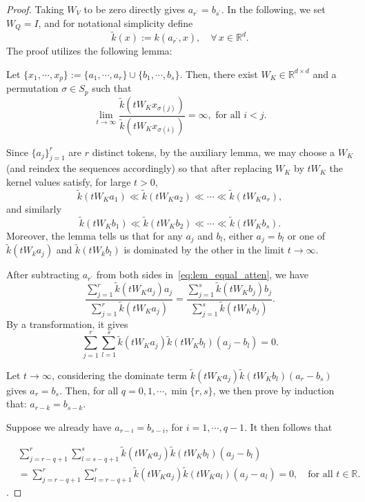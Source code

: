 \documentclass[10pt,a4paper]{amsart}
\begin{document}
\begin{proof}
    Taking $W_V$ to be zero directly gives $a_{r^\prime}=b_{s^\prime}$. In the following, we set $W_Q=I$, and for notational simplicity define
    \[
    \tilde k(x):=k(a_{r^\prime},x),\quad \forall\,x\in\mathbb{R}^d.
    \]
     The proof utilizes the following lemma:
\begin{lemma}
    \label{lem:lemma_aux}
    Let $\{x_1,\cdots, x_p\}:=\{a_1,\cdots, a_r\}\cup \{b_1,\cdots, b_s\}$. Then, there exist $W_K\in\mathbb{R}^{d\times d}$ and a permutation $\sigma\in S_p$ such that
    \begin{equation}
        \lim_{t\to\infty} \frac{\tilde k(tW_K x_{\sigma(j)})}{\tilde k(tW_K x_{\sigma(i)})}=\infty, \text{ for all } i<j.
    \end{equation}
\end{lemma}

Since $\{a_j\}_{j=1}^r$ are $r$ distinct tokens, by the auxiliary lemma, we may choose a $W_K$ (and reindex the sequences accordingly) so that after replacing $W_K$ by $tW_K$ the kernel values satisfy, for large $t>0$,
\[
\tilde k(tW_Ka_1)\ll \tilde k(tW_Ka_2)\ll\cdots\ll \tilde k(tW_Ka_r),
\]
and similarly
\[
\tilde k(tW_Kb_1)\ll \tilde k(tW_Kb_2)\ll\cdots\ll \tilde k(tW_Kb_s).
\]
Moreover, the lemma tells us that for any $a_j$ and $b_l$, either $a_j=b_l$ or one of $\tilde k(tW_ka_j)$ and $\tilde k(tW_kb_l)$ is dominated by the other in the limit $t\to\infty$.


After subtracting $a_{r^\prime}$ from both sides in~\eqref{eq:lem_equal_atten}, we have
\begin{equation}
    \label{eq:mean_eq}
    \frac{\sum_{j=1}^r \tilde k(tW_Ka_j)a_j}{\sum_{j=1}^r \tilde k(tW_Ka_j)}
    = \frac{\sum_{j=1}^s \tilde k(tW_Kb_j)b_j}{\sum_{j=1}^s \tilde k(tW_Kb_j)}.
\end{equation}
By a transformation, it gives
\begin{equation}
    \label{eq:mean_eq2}
\sum_{j=1}^r\sum_{l=1}^s \tilde k(tW_Ka_j)\tilde k(tW_Kb_l)(a_j-b_l)=0.
\end{equation}

Let $t\to \infty$, considering the dominate term $\tilde k(tW_Ka_j)\tilde k(tW_Kb_l)(a_r-b_s)$ gives $a_r=b_s$. Then, for all $q=0, 1,\cdots, \min\{r,s\}$, we then prove by induction that: $a_{r-k}=b_{s-k}$.

Suppose we already have $a_{r-i}=b_{s-i}$, for $i=1,\cdots, q-1$. It then follows that

\begin{equation}
        \label{eq:lem_sum_exp_zero}
        \begin{aligned}
                        &\sum_{j=r-q+1}^r\sum_{l=s-q+1}^s \tilde k(tW_Ka_j)\tilde k(tW_Kb_l)(a_j-b_l)\\
                        &=\sum_{j=r-q+1}^r\sum_{l=r-q+1}^r \tilde k(tW_Ka_j)\tilde k(tW_Ka_l)(a_j-a_l)=0, \quad \text{for all }t\in\mathbb R.
        \end{aligned}
\end{equation}.


\end{proof}
\end{document}
